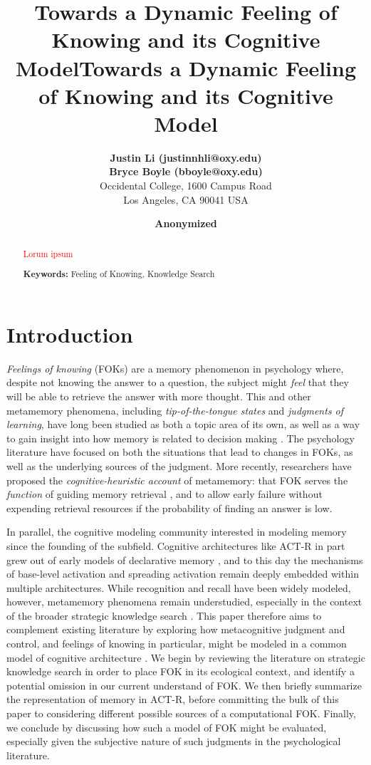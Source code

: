 \documentclass[10pt,letterpaper]{article}
\title{Towards a Dynamic Feeling of Knowing and its Cognitive Model}
\author{
        {\large \bf Justin Li (justinnhli@oxy.edu)} \\
        {\large \bf Bryce Boyle (bboyle@oxy.edu)} \\
        Occidental College, 1600 Campus Road \\
        Los Angeles, CA 90041 USA
    }
\title{Towards a Dynamic Feeling of Knowing and its Cognitive Model}
\author{
    {\large \bf Anonymized}
}
\newcommand{\fixme}[2][]{#2}
\renewcommand{\fixme}[2][]{\textcolor{red}{#2}}
\begin{document}
\maketitle

\begin{abstract}

    \fixme{Lorum ipsum}

    \textbf{Keywords:} Feeling of Knowing, Knowledge Search

\end{abstract}


\section{Introduction}

\emph{Feelings of knowing} (FOKs) are a memory phenomenon in psychology where, despite not knowing the answer to a question, the subject might \emph{feel} that they will be able to retrieve the answer with more thought.
This and other metamemory phenomena, including \emph{tip-of-the-tongue states} and \emph{judgments of learning}, have long been studied as both a topic area of its own, as well as a way to gain insight into how memory is related to decision making \cite{Nelson1994WhyInvestigateMetacognition}.
The psychology literature have focused on both the situations that lead to changes in FOKs, as well as the underlying sources of the judgment.
More recently, researchers have proposed the \emph{cognitive-heuristic account} of metamemory: that FOK serves the \emph{function} of guiding memory retrieval \cite{Schwartz2011TipOfThe}, and to allow early failure without expending retrieval resources if the probability of finding an answer is low.

In parallel, the cognitive modeling community interested in modeling memory since the founding of the subfield.
Cognitive architectures like ACT-R \cite{Anderson2007HowCanThe} in part grew out of early models of declarative memory \cite{Anderson1983ASpreadingActivation, Anderson1991ReflectionsOfThe}, and to this day the mechanisms of base-level activation and spreading activation remain deeply embedded within multiple architectures.
While recognition and recall have been widely modeled, however, metamemory phenomena remain understudied, especially in the context of the broader strategic knowledge search \cite{Newell1972HumanProblemSolving}.
This paper therefore aims to complement existing literature by exploring how metacognitive judgment and control, and feelings of knowing in particular, might be modeled in a common model of cognitive architecture \cite{Laird2017AStandardModel}.
We begin by reviewing the literature on strategic knowledge search in order to place FOK in its ecological context, and identify a potential omission in our current understand of FOK.
We then briefly summarize the representation of memory in ACT-R, before committing the bulk of this paper to considering different possible sources of a computational FOK.
Finally, we conclude by discussing how such a model of FOK might be evaluated, especially given the subjective nature of such judgments in the psychological literature.
\end{document}
